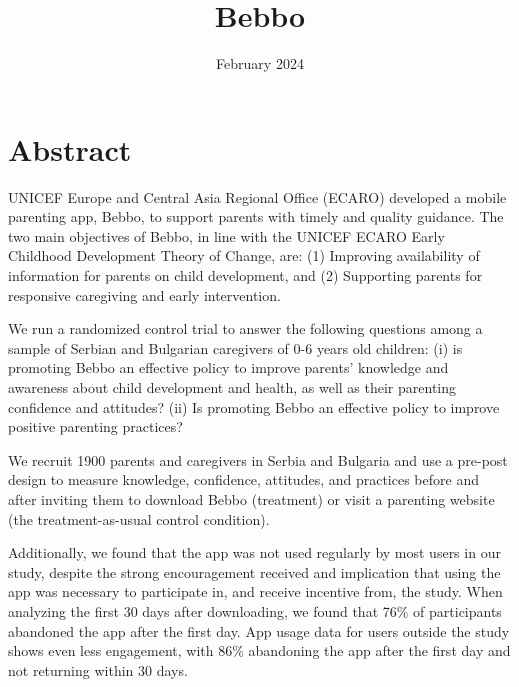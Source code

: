 \documentclass{article}
\title{Bebbo}
\date{February 2024}
\begin{document}
\maketitle

\tableofcontents

\clearpage

\section{Abstract}

UNICEF Europe and Central Asia Regional Office (ECARO) developed a mobile parenting app, Bebbo, to support parents with timely and quality guidance. The two main objectives of Bebbo, in line with the UNICEF ECARO Early Childhood Development Theory of Change, are: (1) Improving availability of information for parents on child development, and (2) Supporting parents for responsive caregiving and early intervention.

We run a randomized control trial to answer the following questions among a sample of Serbian and Bulgarian caregivers of 0-6 years old children: (i) is promoting Bebbo an effective policy to improve parents’ knowledge and awareness about child development and health, as well as their parenting confidence and attitudes? (ii) Is promoting Bebbo an effective policy to  improve positive parenting practices?

We recruit 1900 parents and caregivers in Serbia and Bulgaria and use a pre-post design to measure knowledge, confidence, attitudes, and practices before and after inviting them to download Bebbo (treatment) or visit a parenting website (the treatment-as-usual control condition).


Additionally, we found that the app was not used regularly by most users in our study, despite the strong encouragement received and implication that using the app was necessary to participate in, and receive incentive from, the study. When analyzing the first 30 days after downloading, we found that 76\% of participants abandoned the app after the first day. App usage data for users outside the study shows even less engagement, with 86\% abandoning the app after the first day and not returning within 30 days.
\end{document}
